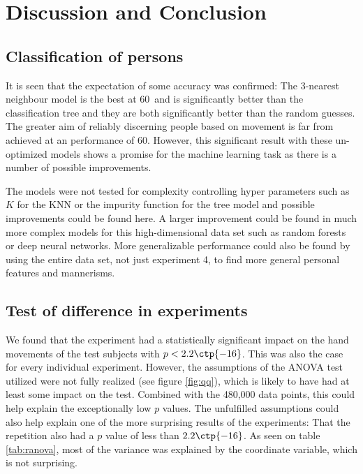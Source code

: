 \documentclass[11pt,fleqn]{article}
\begin{document}
\section{Discussion and Conclusion}
\subsection{Classification of persons}
It is seen that the expectation of some accuracy was confirmed: The 3-nearest neighbour model is the best at 60\pro\ and is significantly better than the classification tree and they are both significantly better than the random guesses. The greater aim of reliably discerning people based on movement is far from achieved at an performance of 60\pro. However, this significant result with these un-optimized models shows a promise for the machine learning task as there is a number of possible improvements. 



The models were not tested for complexity controlling hyper parameters such as \(K\) for the KNN or the impurity function for the tree model and possible improvements could be found here. A larger improvement could be found in much more complex models for this high-dimensional data set such as random forests or deep neural networks. More generalizable performance could also be found by using the entire data set, not just experiment 4, to find more general personal  features and mannerisms.

\subsection{Test of difference in experiments}
We found that the experiment had a statistically significant impact on the hand movements of the test subjects with $ p<2.2\ctp{-16} $.
This was also the case for every individual experiment.
However, the assumptions of the ANOVA test utilized were not fully realized (see figure \ref{fig:qq}), which is likely to have had at least some impact on the test.
Combined with the 480,000 data points, this could help explain the exceptionally low $ p $ values.
The unfulfilled assumptions could also help explain one of the more surprising results of the experiments: That the repetition also had a $ p $ value of less than $ 2.2\ctp{-16} $.
As seen on table \ref{tab:ranova}, most of the variance was explained by the coordinate variable, which is not surprising.
\end{document}
